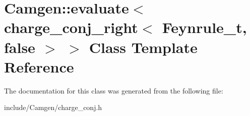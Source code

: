 \hypertarget{a00148}{\section{Camgen\-:\-:evaluate$<$ charge\-\_\-conj\-\_\-right$<$ Feynrule\-\_\-t, false $>$ $>$ Class Template Reference}
\label{a00148}
}


The documentation for this class was generated from the following file\-:\begin{DoxyCompactItemize}
\item 
include/\-Camgen/charge\-\_\-conj.\-h\end{DoxyCompactItemize}
